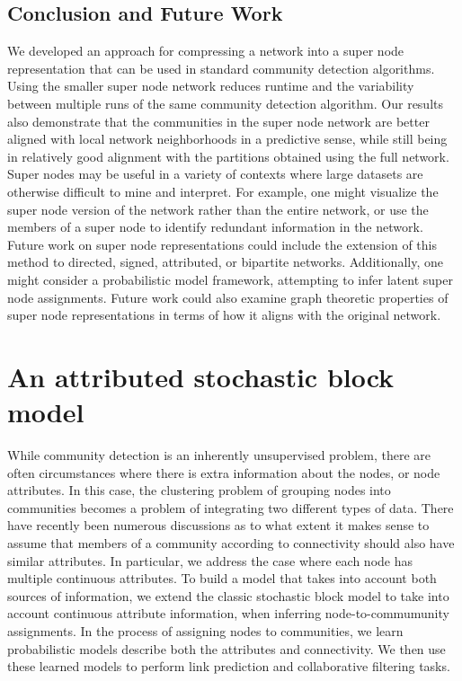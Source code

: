 \section{Conclusion and Future Work}
\indent We developed an approach for compressing a network into a super node representation that can be used in standard community detection algorithms. Using the smaller super node network reduces runtime and the variability between multiple runs of the same community detection algorithm. Our results also demonstrate that the communities in the super node network are better aligned with local network neighborhoods in a predictive sense, while still being in relatively good alignment with the partitions obtained using the full network. \\
\indent Super nodes may be useful in a variety of contexts where large datasets are otherwise difficult to mine and interpret. For example, one might visualize the super node version of the network rather than the entire network, or use the members of a super node to identify redundant information in the network. Future work on super node representations could include the extension of this method to directed, signed, attributed, or bipartite networks. Additionally, one might consider a probabilistic model framework, attempting to infer latent super node assignments. 
Future work could also examine graph theoretic properties of super node representations in terms of how it aligns with the original network. 

\chapter{An attributed stochastic block model}
\indent While community detection is an inherently unsupervised problem, there are often circumstances where there is extra information about the nodes, or node attributes. In this case, the clustering problem of grouping nodes into communities becomes a problem of integrating two different types of data. There have recently been numerous discussions as to what extent it makes sense to assume that members of a community according to connectivity should also have similar attributes. In particular, we address the case where each node has multiple continuous attributes. To build a model that takes into account both sources of information, we extend the classic stochastic block model to take into account continuous attribute information, when inferring node-to-commumunity assignments. In the process of assigning nodes to communities, we learn probabilistic models describe both the attributes and connectivity. We then use these learned models to perform link prediction and collaborative filtering tasks. 

